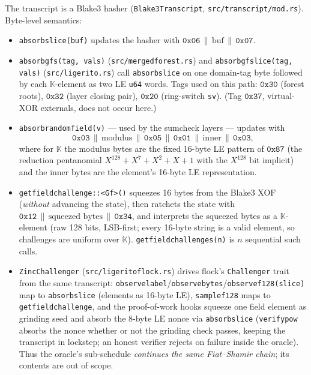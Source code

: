 \documentclass[11pt]{article}
\newcommand{\K}{\mathbb{K}}            %
\newcommand{\code}[1]{{\def\_{\textunderscore\allowbreak}\texttt{#1}}}
\begin{document}
The transcript is a Blake3 hasher (\code{Blake3Transcript},
\code{src/transcript/mod.rs}).  Byte-level semantics:
\begin{itemize}[itemsep=1pt]
\item \code{absorb\_slice(buf)} updates the hasher with
  $\mathtt{0x06} \,\|\, \mathrm{buf} \,\|\, \mathtt{0x07}$.
\item \code{absorb\_gfs(tag, vals)} (\code{src/merged\_forest.rs}) and
  \code{absorb\_gf\_slice(tag, vals)} (\code{src/ligerito.rs}) call
  \code{absorb\_slice} on one domain-tag byte followed by each
  $\K$-element as two LE \code{u64} words.  Tags used
  on this path: $\mathtt{0x30}$ (forest roots), $\mathtt{0x32}$ (layer
  closing pair), $\mathtt{0x20}$ (ring-switch \code{s\_v}).  (Tag
  $\mathtt{0x37}$, virtual-XOR externals, does not occur here.)
\item \code{absorb\_random\_field(v)} — used by the sumcheck layers —
  updates with
  \[
    \mathtt{0x03} \,\|\, \mathrm{modulus} \,\|\, \mathtt{0x05} \,\|\,
    \mathtt{0x01} \,\|\, \mathrm{inner} \,\|\, \mathtt{0x03},
  \]
  where for $\K$ the modulus bytes are the fixed 16-byte LE pattern of
  $\mathtt{0x87}$ (the reduction pentanomial
  $X^{128}+X^7+X^2+X+1$ with the $X^{128}$ bit implicit) and the inner
  bytes are the element's 16-byte LE representation.
\item \code{get\_field\_challenge::<Gf>()} squeezes 16 bytes from the
  Blake3 XOF (\emph{without} advancing the state), then ratchets the state
  with $\mathtt{0x12} \,\|\, \text{squeezed bytes} \,\|\, \mathtt{0x34}$,
  and interprets the squeezed bytes as a $\K$-element (raw 128 bits,
  LSB-first; every 16-byte string is a valid element, so challenges are
  uniform over $\K$).  \code{get\_field\_challenges(n)} is $n$ sequential
  such calls.
\item \code{ZincChallenger} (\code{src/ligerito\_flock.rs}) drives
  flock's \code{Challenger} trait from the same transcript:
  \code{observe\_label}/\code{observe\_bytes}/\code{observe\_f128(\_slice)}
  map to \code{absorb\_slice} (elements as 16-byte LE),
  \code{sample\_f128} maps to \code{get\_field\_challenge}, and the
  proof-of-work hooks squeeze one field element as grinding seed and
  absorb the 8-byte LE nonce via \code{absorb\_slice}
  (\code{verify\_pow} absorbs the nonce whether or not the grinding check
  passes, keeping the transcript in lockstep; an honest verifier rejects
  on failure inside the oracle).  Thus the oracle's sub-schedule
  \emph{continues the same Fiat--Shamir chain}; its contents are out of
  scope.
\end{itemize}
\end{document}
